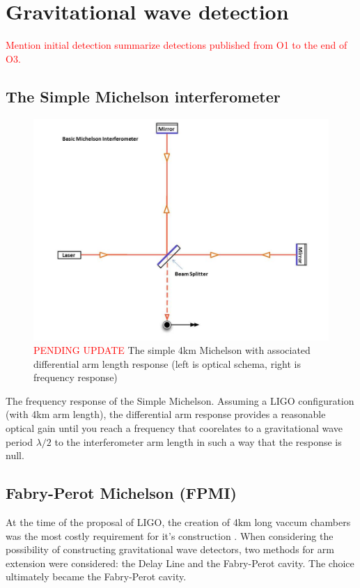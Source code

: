 \section{Gravitational wave detection}
\textcolor{red}{Mention initial detection summarize detections published from O1 to the end of O3.}
\\

\newpage
\subsection{The Simple Michelson interferometer}
\begin{figure}[H]
\begin{center}
\includegraphics[width=\textwidth]{figs/INTRO/tempsub_Basic_michelson_labeled.jpg}
\end{center}
\caption{\textcolor{red}{PENDING UPDATE} The simple 4km Michelson with associated differential arm length response (left is optical schema, right is frequency response)}
\label{fig:simple_michelson}
\end{figure}

The frequency response of the Simple Michelson. Assuming a LIGO configuration (with 4km arm length), the differential arm response provides a reasonable optical gain until you reach a frequency that coorelates to a gravitational wave period $\lambda / 2$ to the interferometer arm length in such a way that the response is null.

\subsection{Fabry-Perot Michelson (FPMI)}
At the time of the proposal of LIGO, the creation of 4km long vaccum chambers was the most costly requirement for it's construction \cite{?}. When considering the possibility of constructing gravitational wave detectors, two methods for arm extension were considered: the Delay Line and the Fabry-Perot cavity. The choice ultimately became the Fabry-Perot cavity.

